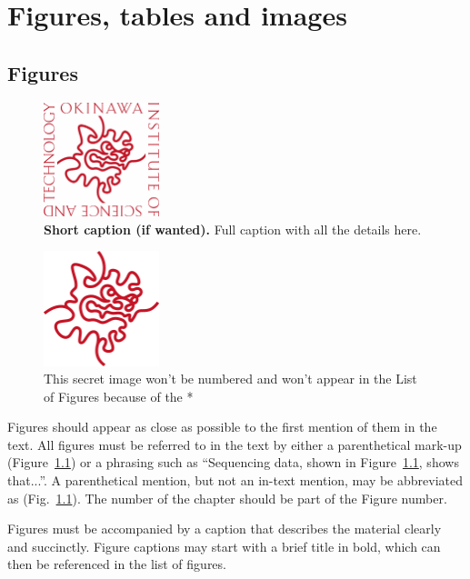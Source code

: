 

\chapter{Figures, tables and images} \label{chap-3}

\section{Figures}

\begin{figure}
\center
\includegraphics[width=0.3\textwidth]{Images/chap3/emblem.jpg} 
\caption[Short caption for List of Figures]{{\bfseries Short caption (if wanted).} Full caption with all the details here.}
\label{fig-example}
\end{figure}

\begin{figure}
\center
\includegraphics[width=0.3\textwidth]{Images/chap3/symbol.jpg} 
\caption*{This secret image won't be numbered and won't appear in the List of Figures because of the *}
\end{figure}

Figures should appear as close as possible to the first mention of them in the text. All figures must be referred to in the text by either a parenthetical mark-up (Figure~\ref{fig-example}) or a phrasing such as ``Sequencing data, shown in Figure~\ref{fig-example}, shows that...''.  A parenthetical mention, but not an in-text mention, may be abbreviated as (Fig.~\ref{fig-example}).  The number of the chapter should be part of the Figure number.

Figures must be accompanied by a caption that describes the material clearly and succinctly. Figure captions may start with a brief title in bold, which can then be referenced in the list of figures. 

